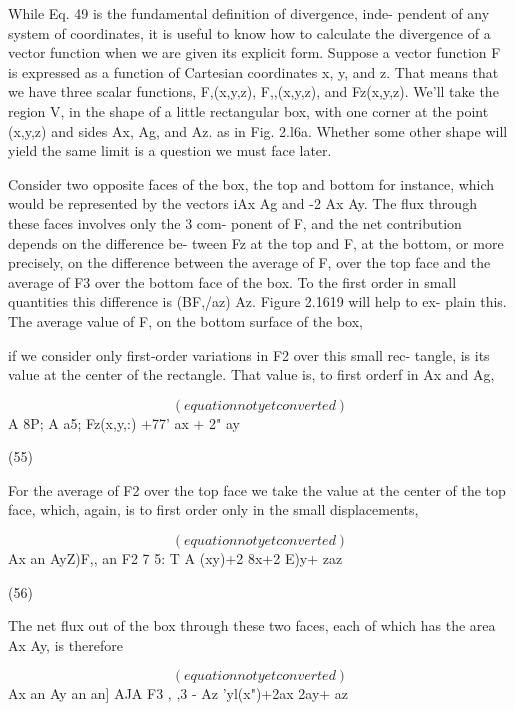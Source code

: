 While Eq. 49 is the fundamental definition of divergence, inde-
pendent of any system of coordinates, it is useful to know how to
calculate the divergence of a vector function when we are given its
explicit form. Suppose a vector function F is expressed as a function
of Cartesian coordinates x, y, and z. That means that we have three
scalar functions, F,(x,y,z), F,,(x,y,z), and Fz(x,y,z). We'll take the
region V, in the shape of a little rectangular box, with one corner at
the point (x,y,z) and sides Ax, Ag, and Az. as in Fig. 2.l6a. Whether
some other shape will yield the same limit is a question we must face
later.

Consider two opposite faces of the box, the top and bottom for
instance, which would be represented by the vectors iAx Ag and
-2 Ax Ay. The flux through these faces involves only the 3 com-
ponent of F, and the net contribution depends on the difference be-
tween Fz at the top and F, at the bottom, or more precisely, on the
difference between the average of F, over the top face and the average
of F3 over the bottom face of the box. To the first order in small
quantities this difference is (BF,/az) Az. Figure 2.1619 will help to ex-
plain this. The average value of F, on the bottom surface of the box,

if we consider only first-order variations in F2 over this small rec-
tangle, is its value at the center of the rectangle. That value is, to
first orderf in Ax and Ag,

\begin{equation}
(equation not yet converted)
\end{equation}
A 8P; A a5;
Fz(x,y,:) +77' ax + 2" ay

(55)

For the average of F2 over the top face we take the value at the
center of the top face, which, again, is to first order only in the small
displacements,

\begin{equation}
(equation not yet converted)
\end{equation}
Ax an AyZ)F,, an
F2 7 5: T A
(xy)+2 8x+2 E)y+ zaz

(56)

The net flux out of the box through these two faces, each of which has
the area Ax Ay, is therefore

\begin{equation}
(equation not yet converted)
\end{equation}
Ax an Ay an an]
AJA F3 , ,3 - Az
'yl(x")+2ax 2ay+ az

